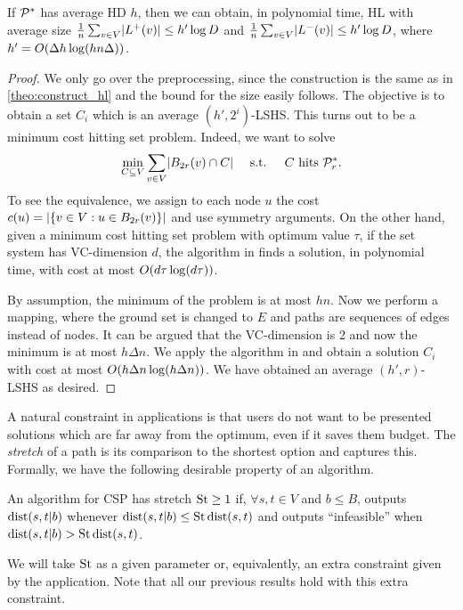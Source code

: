\begin{theorem}\label{theo:preproc_avg}
If $\mathcal{P}^*$ has average HD $h$, then we can obtain, in polynomial time, HL with average size 
$\frac{1}{n}\sum_{v\in V} \lvert L^+(v)\rvert \leq h'\log D$ and 
$\frac{1}{n}\sum_{v\in V} \lvert L^-(v)\rvert \leq h'\log D$,
where $h'=O(\Delta h\log (hn\Delta))$.
\end{theorem}
\begin{proof}
We only go over the preprocessing, since the construction is the same as in \cref{theo:construct_hl} and the bound for the size easily follows. 
The objective is to obtain a set $C_i$ which is an average $(h',2^i)$-LSHS.
This turns out to be a minimum cost hitting set problem.
Indeed, we want to solve
\[
\min_{C\subseteq V} \sum_{v\in V}\lvert B_{2r}(v)\cap C\rvert  \quad \text{ s.t. } \quad C \text{ hits } \mathcal{P}^*_r.
\]
To see the equivalence, we assign to each node $u$ the cost $c(u)=\lvert\{v\in V: u\in B_{2r}(v)\}\rvert$ and use symmetry arguments.
On the other hand, given a minimum cost hitting set problem with optimum value $\tau$, if the set system has VC-dimension $d$, the algorithm in \cite{vc_dim_hitting} finds a solution, in polynomial time, with cost at most $O(d\tau\log(d\tau))$.

By assumption, the minimum of the problem is at most $hn$.
Now we perform a mapping, where the ground set is changed to $E$ and paths are sequences of edges instead of nodes.
It can be argued that the VC-dimension is 2 and now the minimum is at most $h\Delta n$.
We apply the algorithm in \cite{vc_dim_hitting} and obtain a solution $C_i$ with cost at most $O(h\Delta n\log(h\Delta n))$.
We have obtained an average $(h',r)$-LSHS as desired.
\end{proof}

A natural constraint in applications is that users do not want to be presented solutions which are far away from the optimum, even if it saves them budget.
The \emph{stretch} of a path is its comparison to the shortest option and captures this.
Formally, we have the following desirable property of an algorithm.

\begin{definition}[Stretch]
An algorithm for CSP has stretch $\operatorname{St}\geq 1$ if, $\forall s,t\in V$ and $b\leq B$, outputs $\mbox{dist}(s,t|b)$ whenever $\mbox{dist}(s,t|b)\leq \operatorname{St}\mbox{dist}(s,t)$ and outputs ``infeasible'' when $\mbox{dist}(s,t|b)>\operatorname{St}\mbox{dist}(s,t)$.
\end{definition}
We will take $\operatorname{St}$ as a given parameter or, equivalently, an extra constraint given by the application. 
Note that all our previous results hold with this extra constraint.